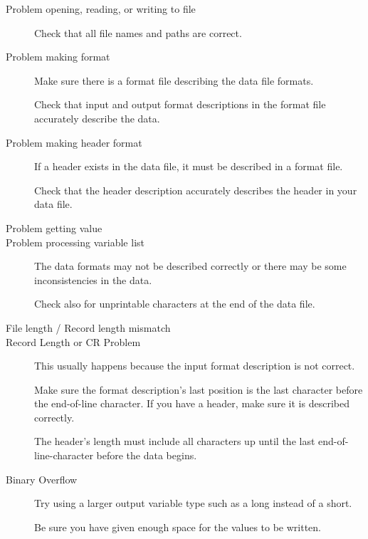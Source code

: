 \begin{description}

\item[Problem opening, reading, or writing to file]
  
  Check that all file names and paths are correct.

\item[Problem making format]
  
  Make sure there is a format file describing the data file formats.
  
  Check that input and output format descriptions in the format file
  accurately describe the data.

\item[Problem making header format]
  
  If a header exists in the data file, it must be described in a
  format file.
  
  Check that the header description accurately describes the header in
  your data file.

\item[Problem getting value]

\item[Problem processing variable list]
  
  The data formats may not be described correctly or there may be some
  inconsistencies in the data.
  
  Check also for unprintable characters at the end of the data file.

\item[File length / Record length mismatch]
  
\item[Record Length or CR Problem]
  
  This usually happens because the input format description is not
  correct.
  
  Make sure the format description's last position is the last
  character before the end-of-line character. If you have a header,
  make sure it is described correctly.
  
  The header's length must include all characters up until the last
  end-of-line-character before the data begins.

\item[Binary Overflow]
  
  Try using a larger output variable type such as a long instead of a
  short.
  
  Be sure you have given enough space for the values to be written.
  

\end{description}
